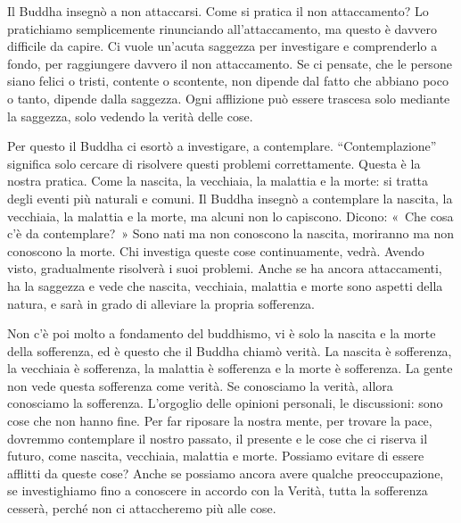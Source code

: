 Il Buddha insegnò a non attaccarsi. Come si pratica il non attaccamento?
Lo pratichiamo semplicemente rinunciando all'attaccamento, ma questo è
davvero difficile da capire. Ci vuole un'acuta saggezza per investigare
e comprenderlo a fondo, per raggiungere davvero il non attaccamento. Se
ci pensate, che le persone siano felici o tristi, contente o scontente,
non dipende dal fatto che abbiano poco o tanto, dipende dalla saggezza.
Ogni afflizione può essere trascesa solo mediante la saggezza, solo
vedendo la verità delle cose.

Per questo il Buddha ci esortò a investigare, a contemplare.
``Contemplazione'' significa solo cercare di risolvere questi problemi
correttamente. Questa è la nostra pratica. Come la nascita, la
vecchiaia, la malattia e la morte: si tratta degli eventi più naturali e
comuni. Il Buddha insegnò a contemplare la nascita, la vecchiaia, la
malattia e la morte, ma alcuni non lo capiscono. Dicono: «~Che cosa c'è
da contemplare?~» Sono nati ma non conoscono la nascita, moriranno ma
non conoscono la morte. Chi investiga queste cose continuamente, vedrà.
Avendo visto, gradualmente risolverà i suoi problemi. Anche se ha ancora
attaccamenti, ha la saggezza e vede che nascita, vecchiaia, malattia e
morte sono aspetti della natura, e sarà in grado di alleviare la propria
sofferenza.

Non c'è poi molto a fondamento del buddhismo, vi è solo la nascita e la
morte della sofferenza, ed è questo che il Buddha chiamò verità. La
nascita è sofferenza, la vecchiaia è sofferenza, la malattia è
sofferenza e la morte è sofferenza. La gente non vede questa sofferenza
come verità. Se conosciamo la verità, allora conosciamo la sofferenza.
L'orgoglio delle opinioni personali, le discussioni: sono cose che non
hanno fine. Per far riposare la nostra mente, per trovare la pace,
dovremmo contemplare il nostro passato, il presente e le cose che ci
riserva il futuro, come nascita, vecchiaia, malattia e morte. Possiamo
evitare di essere afflitti da queste cose? Anche se possiamo ancora
avere qualche preoccupazione, se investighiamo fino a conoscere in
accordo con la Verità, tutta la sofferenza cesserà, perché non ci
attaccheremo più alle cose.

